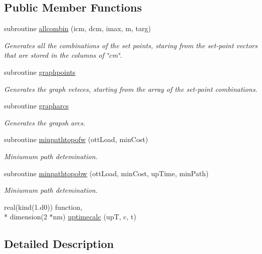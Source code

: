 \subsection*{Public Member Functions}
\begin{DoxyCompactItemize}
\item 
subroutine \hyperlink{classgraphtools_a4607d975b5dd57d2ca7fcdbab2b1ef56}{allcombin} (icm, dcm, imax, m, targ)
\begin{DoxyCompactList}\small\item\em Generates all the combinations of the set points, staring from the set-\/point vectors that are stored in the columns of \char`\"{}cm\char`\"{}. \end{DoxyCompactList}\item 
subroutine \hyperlink{classgraphtools_a94b8e6e5a3d3cc0c3bedbe00d57fc2f9}{graphpoints}
\begin{DoxyCompactList}\small\item\em Generates the graph veteces, starting from the array of the set-\/point combinations. \end{DoxyCompactList}\item 
subroutine \hyperlink{classgraphtools_a47c76f30f7f4917536f94c642ffca865}{grapharcs}
\begin{DoxyCompactList}\small\item\em Generates the grapsh arcs. \end{DoxyCompactList}\item 
subroutine \hyperlink{classgraphtools_ade3577b19aec190e8e056f041bc8afdf}{minpathtopofw} (ott\-Load, min\-Cost)
\begin{DoxyCompactList}\small\item\em Miniumum path detemination. \end{DoxyCompactList}\item 
subroutine \hyperlink{classgraphtools_abef4e47145f628bc6d3001d4f6bd9601}{minpathtopobw} (ott\-Load, min\-Cost, up\-Time, min\-Path)
\begin{DoxyCompactList}\small\item\em Miniumum path detemination. \end{DoxyCompactList}\item 
real(kind(1.d0)) function, \\*
dimension(2 $\ast$nm) \hyperlink{classgraphtools_ac61c9cdfdbeb51411798714a7ba88c3e}{uptimecalc} (up\-T, c, t)
\end{DoxyCompactItemize}


\subsection{Detailed Description}


